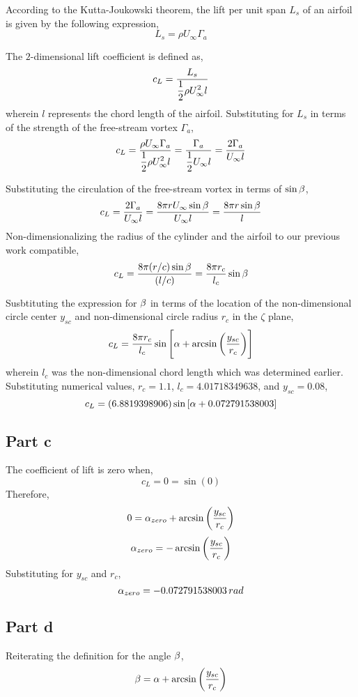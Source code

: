 \documentclass[class=report, 12pt, crop=false]{standalone}
\begin{document}
\begin{center}
According to the Kutta-Joukowski theorem, the lift per unit span $L_s$ of an airfoil is given by the following expression,
$$L_s = \rho U_\infty \Gamma_a$$

The $2$-dimensional lift coefficient is defined as,
$$c_L = \frac{L_s}{\displaystyle{\frac{1}{2}\rho U_\infty^2 l}}$$
wherein $l$ represents the chord length of the airfoil. Substituting for $L_s$ in terms of the strength of the free-stream vortex $\Gamma_a$,
$$c_L = \frac{\rho U_\infty \Gamma_a}{\displaystyle{\frac{1}{2}\rho U_\infty^2 l}} = \frac{ \Gamma_a}{\displaystyle{\frac{1}{2} U_\infty l}} = \frac{2\Gamma_a}{\displaystyle{U_\infty l}}$$

Substituting the circulation of the free-stream vortex in terms of $\sin\beta$,
$$c_L = \frac{2\Gamma_a}{\displaystyle{U_\infty l}} = \frac{8\pi r U_\infty\sin\beta}{\displaystyle{U_\infty l}} = \frac{8\pi r \sin\beta}{\displaystyle{ l}}$$
Non-dimensionalizing the radius of the cylinder and the airfoil to our previous work compatible,
$$c_L = \frac{8\pi (r/c) \sin\beta}{\displaystyle{(l/c)}} = \frac{8\pi r_c }{\displaystyle{l_c}}\sin\beta$$

Susbtituting the expression for $\beta$ in terms of the location of the non-dimensional circle center $y_{sc}$ and non-dimensional circle radius $r_c$ in the $\zeta$ plane,
$$c_L = \frac{8\pi r_c }{\displaystyle{l_c}}\sin\left[\alpha + \arcsin\left(\frac{y_{sc}}{r_c}\right)\right]$$
wherein $l_c$ was the non-dimensional chord length which was determined earlier. Substituting numerical values, $r_c=1.1$, $l_c=4.01718349638$, and $y_{sc}=0.08$,
$$c_L = (6.8819398906)\sin\left[\alpha + 0.072791538003\right]$$

\subsection{Part c}
The coefficient of lift is zero when,
$$c_L = 0 = \sin(0)$$
Therefore,
$$0 = \alpha_{zero} + \arcsin\left(\frac{y_{sc}}{r_c}\right)$$
$$\alpha_{zero} =  -\arcsin\left(\frac{y_{sc}}{r_c}\right)$$
Substituting for $y_{sc}$ and $r_c$,
$$\alpha_{zero} = -0.072791538003\,rad$$

\subsection{Part d}

Reiterating the definition for the angle $\beta$,
$$\beta = \alpha + \arcsin\left(\frac{y_{sc}}{r_c}\right)$$


\end{center}
\end{document}
